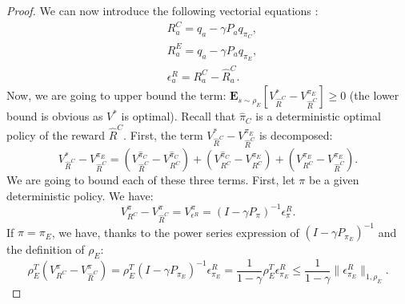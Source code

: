 \documentclass[smallextended]{svjour3}
\newcommand{\E}{\mathbf{E}}
\begin{document}
\begin{proof}
We can now introduce the following vectorial equations :
\begin{align}
&R^C_a=q_a-\gamma P_aq_{\pi_C},
\\
&R^E_a=q_a-\gamma P_aq_{\pi_E},
\\
&\epsilon^R_a=R^C_a-\hat{R}^C_a.
\end{align}
Now, we are going to upper bound the term: $\E_{s\sim\rho_E}[V^*_{\hat{R}^C}-V^{\pi_E}_{\hat{R}^C}]\geq0$ (the lower bound is obvious as $V^*$ is optimal).
Recall that $\hat{\pi}_C$ is a deterministic optimal policy of the reward $\hat{R}^C$. First, the term $V^*_{\hat{R}^C}-V^{\pi_E}_{\hat{R}^C}$ is decomposed:
\begin{equation}
V^*_{\hat{R}^C}-V^{\pi_E}_{\hat{R}^C}=(V^{\hat{\pi}_C}_{\hat{R}^C}-V^{\hat{\pi}_C}_{R^C})+(V^{\hat{\pi}_C}_{R^C}-V^{\pi_E}_{R^C})+(V^{\pi_E}_{R^C}-V^{\pi_E}_{\hat{R}^C}).
\end{equation}
We are going to bound each of these three terms. First, let $\pi$ be a given deterministic policy. We have:
\begin{equation}
V^{\pi}_{R^C}-V^{\pi}_{\hat{R}^C}=V^{\pi}_{\epsilon^R}=(I-\gamma P_\pi)^{-1}\epsilon^R_{\pi}.
\end{equation}
If $\pi=\pi_E$, we have, thanks to the power series expression of $(I-\gamma P_{\pi_E})^{-1}$ and the definition of $\rho_E$:
\begin{equation}
  \rho_E^T(V^{\pi}_{R^C}-V^{\pi}_{\hat{R}^C})=\rho_E^T(I-\gamma P_{\pi_E})^{-1}\epsilon^R_{\pi_E}=\frac{1}{1-\gamma}\rho_E^T\epsilon^R_{\pi_E}\leq\frac{1}{1-\gamma}\|\epsilon^R_{\pi_E}\|_{1,\rho_E}.\end{equation}


\end{proof}
\end{document}
